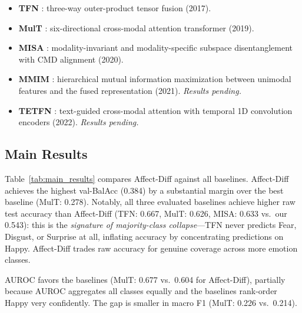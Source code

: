 \documentclass[conference]{IEEEtran}
\begin{document}
\begin{itemize}
    \item \textbf{TFN} \cite{zadeh2017tfn}: three-way outer-product tensor fusion
          (2017).
    \item \textbf{MulT} \cite{tsai2019mult}: six-directional cross-modal
          attention transformer (2019).
    \item \textbf{MISA} \cite{hazarika2020misa}: modality-invariant and
          modality-specific subspace disentanglement with CMD alignment (2020).
    \item \textbf{MMIM} \cite{han2021mmim}: hierarchical mutual information
          maximization between unimodal features and the fused representation
          (2021). \emph{Results pending.}
    \item \textbf{TETFN} \cite{yang2022tetfn}: text-guided cross-modal attention
          with temporal 1D convolution encoders (2022). \emph{Results pending.}
\end{itemize}

\subsection{Main Results}

Table~\ref{tab:main_results} compares Affect-Diff against all baselines.
Affect-Diff achieves the highest val-BalAcc (0.384) by a substantial margin
over the best baseline (MulT: 0.278).  Notably, all three evaluated baselines
achieve higher raw test accuracy than Affect-Diff (TFN: 0.667, MulT: 0.626,
MISA: 0.633 vs.\ our 0.543): this is the \emph{signature of majority-class
collapse}---TFN never predicts Fear, Disgust, or Surprise at all, inflating
accuracy by concentrating predictions on Happy.  Affect-Diff trades raw
accuracy for genuine coverage across more emotion classes.

AUROC favors the baselines (MulT: 0.677 vs.\ 0.604 for Affect-Diff), partially
because AUROC aggregates all classes equally and the baselines rank-order Happy
very confidently.  The gap is smaller in macro F1 (MulT: 0.226 vs.\ 0.214).
\end{document}
